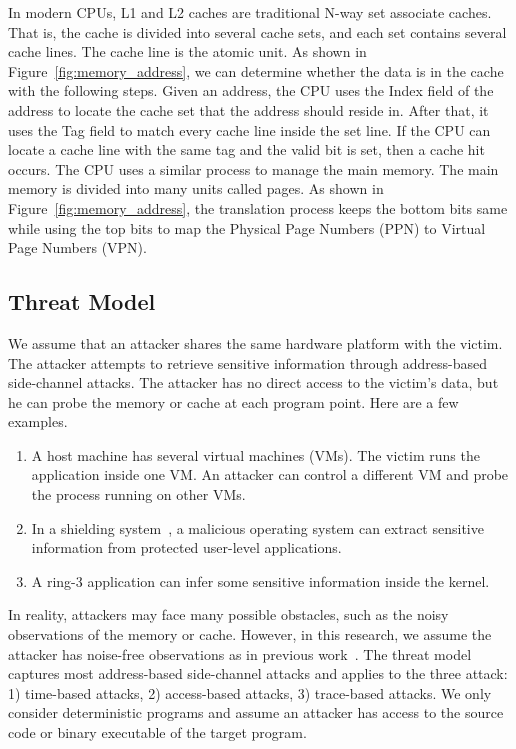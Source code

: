 In modern CPUs, L1 and L2 caches are traditional N-way set associate caches. That is, the cache is divided into several cache sets, and each set contains several cache lines. The cache line is the atomic unit. As shown in Figure~\ref{fig:memory_address}, we can determine whether the data is in the cache with the following steps.  Given an address, the CPU uses the \textsf{Index} field of the address to locate the cache set that the address should reside in. After that, it uses the \textsf{Tag} field to match every cache line inside the set line. If the CPU can locate a cache line with the same tag and the valid bit is set, then a cache hit occurs. The CPU uses a similar process to manage the main memory. The main memory is divided into many units called pages. As shown in Figure~\ref{fig:memory_address},
the translation process keeps the bottom bits same while using the top bits to map the Physical Page Numbers (PPN) to Virtual Page Numbers (VPN). 

\subsection{Threat Model}
We assume that an attacker shares the same hardware platform with the victim.
The attacker attempts to retrieve sensitive information through address-based side-channel attacks. The attacker has no direct access to the victim's data, but he can probe the memory or cache at each program point. Here are a few examples.
\begin{enumerate}
  \item A host machine has several virtual machines (VMs). The victim runs the application inside one VM. An attacker can control a different VM and probe the process running on other VMs.
  \item  In a shielding system~\cite{arnautov2016scone,schuster2015vc3}, a malicious operating system can extract sensitive information from protected user-level applications.
  \item A ring-3 application can infer some sensitive information inside the kernel.
\end{enumerate}

In reality, attackers may face many possible obstacles, such as the noisy observations of the memory or cache. However, in this research, we assume the attacker has noise-free observations as in previous work~\cite{203878,182946,Brotzman19Casym}. The threat model captures most address-based side-channel attacks and applies to the three attack: 1) time-based attacks, 2) access-based attacks, 3) trace-based attacks. We only consider deterministic programs and assume an attacker has access to the source code or binary executable of the target program.

